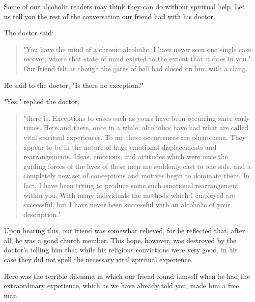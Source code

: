 \begin{biblechapter}

Some of our alcoholic readers may think they can do without spiritual help. 
Let us tell you the rest of the conversation our friend had with his doctor.

The doctor said: 
\begin{quote}
    "You have the mind of a chronic alcoholic. 
    I have never seen one single case recover, 
    where that state of mind existed to the extent that it does in you." 
    Our friend felt as though the gates of hell had closed on him with a clang.
\end{quote}

He said to the doctor, "Is there no exception?"

"Yes," replied the doctor, 
\begin{quote}
    "there is. 
    Exceptions to cases such as yours have been occurring since early times. 
    Here and there, once in a while, alcoholics have had what are called vital spiritual experiences. 
    To me these occurrences are phenomena. 
    They appear to be in the nature of huge emotional displacements and rearrangements. 
    Ideas, emotions, and attitudes which were once the guiding forces of the lives of these men are suddenly cast to one side, 
    and a completely new set of conceptions and motives begin to dominate them. 
    In fact, I have been trying to produce some such emotional rearrangement within you. 
    With many individuals the methods which I employed are successful, 
    but I have never been successful with an alcoholic of your description."
\end{quote}

Upon hearing this, our friend was somewhat relieved, for he reflected that, after all, he was a good church member. 
This hope, however, was destroyed by the doctor's telling him that while his religious convictions were very good, 
in his case they did not spell the necessary vital spiritual experience.

Here was the terrible dilemma in which our friend found himself when he had the extraordinary experience, 
which as we have already told you, made him a free man.
\end{biblechapter}


